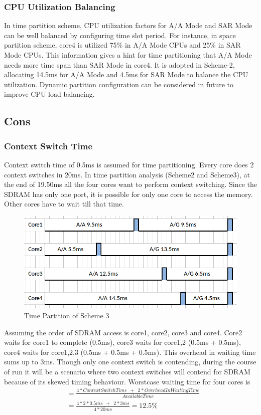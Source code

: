 \subsubsection{CPU Utilization Balancing}
In time partition scheme, CPU utilization factors for A/A Mode and SAR Mode can be well balanced by configuring time slot period. For instance, in space partition scheme, core4 is utilized 75\% in A/A Mode CPUs and 25\% in SAR Mode CPUs. This information gives a hint for time partitioning that A/A Mode needs more time span than SAR Mode in core4. It is adopted in Scheme-2, allocating 14.5ms for A/A Mode and 4.5ms for SAR Mode to balance the CPU utilization. Dynamic partition configuration can be considered in future to improve CPU load balancing.

\subsection{Cons}
\label{mm:cons}

\subsubsection{Context Switch Time}
Context switch time of 0.5ms is assumed for time partitioning. Every core does 2 context switches in 20ms. In time partition analysis (Scheme2 and Scheme3), at the end of 19.50ms all the four cores want to perform context switching. Since the SDRAM has only one port, it is possible for only one core to access the memory. Other cores have to wait till that time. 

\begin{figure}[h!]
	\centering
	\includegraphics[width=120mm]{figures/mm_cons1}
	\caption{Time Partition of Scheme 3}
	\label{fig:mm:mm_cons1}
\end{figure}

Assuming the order of SDRAM access is core1, core2, core3 and core4. Core2 waits for core1 to complete (0.5ms), core3 waits for core1,2 (0.5ms + 0.5ms), core4 waits for core1,2,3 (0.5ms + 0.5ms + 0.5ms). This overhead in waiting time sums up to 3ms. Though only one context switch is contending, during the course of run it will be a scenario where two context switches will contend for SDRAM because of its skewed timing behaviour. Worstcase waiting time for four cores is 
	\begin{equation}
		\begin{split}
			& = \frac{4*ContextSwitchTime \enspace + \enspace 2*OverheadInWaitingTime}{AvailableTime} \\[0.4cm]
			& = \frac{4*2*0.5ms \enspace + \enspace 2*3ms}{4*20ms}
			  = 12.5\%
		\end{split}
	\end{equation}

